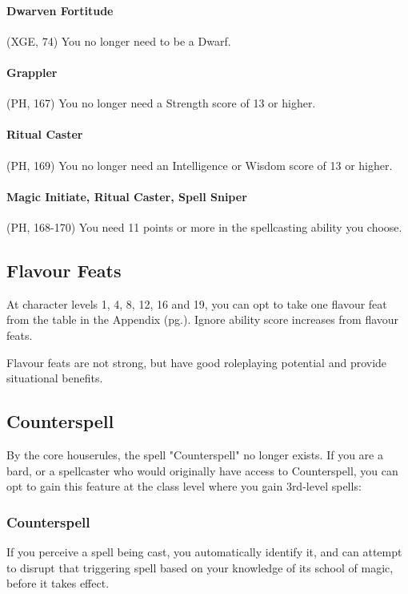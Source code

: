 \documentclass[letterpaper,twocolumn,openany,nodeprecatedcode]{dndbook}
\newcommand{\pg}[1]{pg.\pageref{#1}}
\begin{document}
\paragraph{Dwarven Fortitude} (XGE, 74) You no longer need to be a Dwarf.

\paragraph{Grappler} (PH, 167) You no longer need a Strength score of 13 or higher.

\paragraph{Ritual Caster} (PH, 169) You no longer need an Intelligence or Wisdom score of 13 or higher.

\paragraph{Magic Initiate, Ritual Caster, Spell Sniper} (PH, 168-170) You need 11 points or more in the spellcasting ability you choose.

\label{flavour-feats}
\subsection{Flavour Feats}
At character levels 1, 4, 8, 12, 16 and 19, you can opt to take one flavour feat from the table in the Appendix (\pg{flavour-feats-table}). Ignore ability score increases from flavour feats.

Flavour feats are not strong, but have good roleplaying potential and provide situational benefits.

\label{counterspell}
\subsection{Counterspell}
By the core houserules, the spell "Counterspell" no longer exists. If you are a bard, or a spellcaster who would originally have access to Counterspell, you can opt to gain this feature at the class level where you gain 3rd-level spells:

\subsubsection{Counterspell}
If you perceive a spell being cast, you automatically identify it, and can attempt to disrupt that triggering spell based on your knowledge of its school of magic, before it takes effect.
\end{document}
